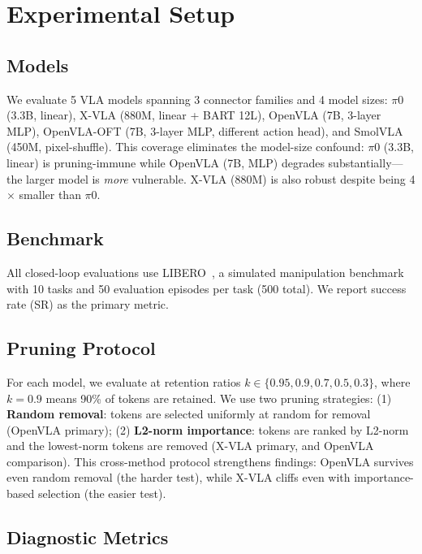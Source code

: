 \documentclass[letterpaper]{article}
\begin{document}
\section{Experimental Setup}

\subsection{Models}

We evaluate 5 VLA models spanning 3 connector families and 4 model sizes: $\pi$0 (3.3B, linear), X-VLA (880M, linear + BART 12L), OpenVLA (7B, 3-layer MLP), OpenVLA-OFT (7B, 3-layer MLP, different action head), and SmolVLA (450M, pixel-shuffle). This coverage eliminates the model-size confound: $\pi$0 (3.3B, linear) is pruning-immune while OpenVLA (7B, MLP) degrades substantially---the larger model is \emph{more} vulnerable. X-VLA (880M) is also robust despite being 4$\times$ smaller than $\pi$0.

\subsection{Benchmark}

All closed-loop evaluations use LIBERO~\cite{liu2024libero}, a simulated manipulation benchmark with 10 tasks and 50 evaluation episodes per task (500 total). We report success rate (SR) as the primary metric.

\subsection{Pruning Protocol}

For each model, we evaluate at retention ratios $k \in \{0.95, 0.9, 0.7, 0.5, 0.3\}$, where $k{=}0.9$ means 90\% of tokens are retained. We use two pruning strategies: (1) \textbf{Random removal}: tokens are selected uniformly at random for removal (OpenVLA primary); (2) \textbf{L2-norm importance}: tokens are ranked by L2-norm and the lowest-norm tokens are removed (X-VLA primary, and OpenVLA comparison). This cross-method protocol strengthens findings: OpenVLA survives even random removal (the harder test), while X-VLA cliffs even with importance-based selection (the easier test).

\subsection{Diagnostic Metrics}
\end{document}
